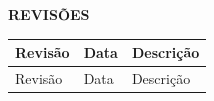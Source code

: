 
\clearpage
\thispagestyle{empty}
\begin{center}
	\textbf{REVISÕES}
\end{center}

\begin{center}
	\begin{longtable}{lp{2cm}p{11cm}}
		\hline                              %
		Revisão & Data & Descrição \\       %
		\hline                              %
		\endfirsthead                       %
		\hline                              %
		Revisão & Data & Descrição \\       %
		\hline                              %
		\endhead                            %


\end{longtable}
\end{center}
